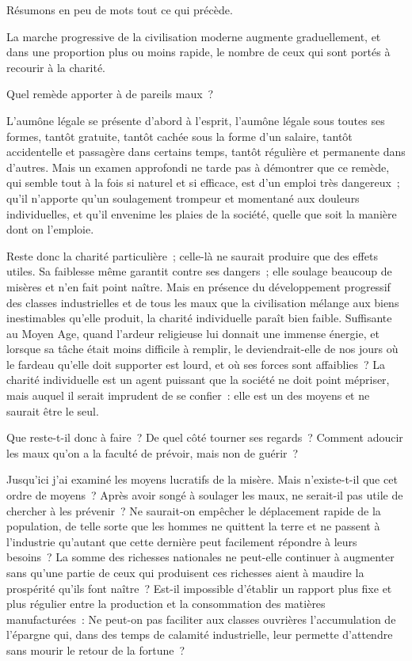 \documentclass[twoside]{book} %
\newcommand{\astermono}{\medskip\centerline{\color{rubric}\large\selectfont{\syms ✻}}\medskip\par}%
\begin{document}
\astermono

\noindent Résumons en peu de mots tout ce qui précède.\par
La marche progressive de la civilisation moderne augmente graduellement, et dans une proportion plus ou moins rapide, le nombre de ceux qui sont portés à recourir à la charité.\par
Quel remède apporter à de pareils maux ?\par
L'aumône légale se présente d’abord à l’esprit, l’aumône légale sous toutes ses formes, tantôt gratuite, tantôt cachée sous la forme d’un salaire, tantôt accidentelle et passagère dans certains temps, tantôt régulière et permanente dans d’autres. Mais un examen approfondi ne tarde pas à démontrer que ce remède, qui semble tout à la fois si naturel et si efficace, est d’un emploi très dangereux ; qu’il n’apporte qu’un soulagement trompeur et momentané aux douleurs individuelles, et qu’il envenime les plaies de la société, quelle que soit la manière dont on l’emploie.\par
Reste donc la charité particulière ; celle-là ne saurait produire que des effets utiles. Sa faiblesse même garantit contre ses dangers ; elle soulage beaucoup de misères et n’en fait point naître. Mais en présence du développement progressif des classes industrielles et de tous les maux que la civilisation mélange aux biens inestimables qu’elle produit, la charité individuelle paraît bien faible. Suffisante au Moyen Age, quand l’ardeur religieuse lui donnait une immense énergie, et lorsque sa tâche était moins difficile à remplir, le deviendrait-elle de nos jours où le fardeau qu’elle doit supporter est lourd, et où ses forces sont affaiblies ? La charité individuelle est un agent puissant que la société ne doit point mépriser, mais auquel il serait imprudent de se confier : elle est un des moyens et ne saurait être le seul.\par
Que reste-t-il donc à faire ? De quel côté tourner ses regards ? Comment adoucir les maux qu’on a la faculté de prévoir, mais non de guérir ?\par
Jusqu’ici j’ai examiné les moyens lucratifs de la misère. Mais n’existe-t-il que cet ordre de moyens ? Après avoir songé à soulager les maux, ne serait-il pas utile de chercher à les prévenir ? Ne saurait-on empêcher le déplacement rapide de la population, de telle sorte que les hommes ne quittent la terre et ne passent à l’industrie qu’autant que cette dernière peut facilement répondre à leurs besoins ? La somme des richesses nationales ne peut-elle continuer à augmenter sans qu’une partie de ceux qui produisent ces richesses aient à maudire la prospérité qu’ils font naître ? Est-il impossible d’établir un rapport plus fixe et plus régulier entre la production et la consommation des matières manufacturées : Ne peut-on pas faciliter aux classes ouvrières l’accumulation de l’épargne qui, dans des temps de calamité industrielle, leur permette d’attendre sans mourir le retour de la fortune ?\par
\end{document}
